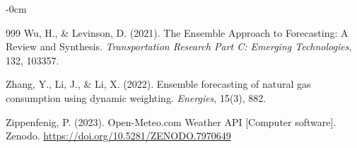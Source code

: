 \documentclass[journal,article,submit,pdftex,moreauthors]{Definitions/mdpi}
\begin{document}
\begin{adjustwidth}{-\extralength}{0cm}
{\begin{thebibliography}{999}
Wu, H., \& Levinson, D. (2021). The Ensemble Approach to Forecasting: A Review and Synthesis. \textit{Transportation Research Part C: Emerging Technologies}, 132, 103357.

Zhang, Y., Li, J., \& Li, X. (2022). Ensemble forecasting of natural gas consumption using dynamic weighting. \textit{Energies}, 15(3), 882.

Zippenfenig, P. (2023). Open-Meteo.com Weather API [Computer software]. Zenodo. \url{https://doi.org/10.5281/ZENODO.7970649}

\end{thebibliography}
}
\PublishersNote{}
\end{adjustwidth}

\end{document}

